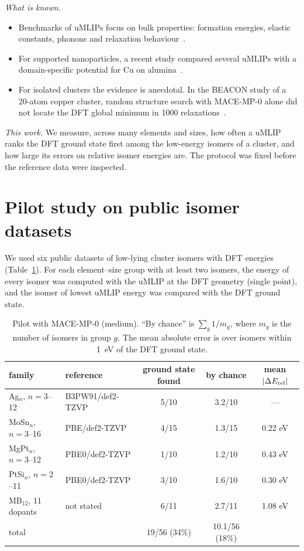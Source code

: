 \documentclass[11pt]{article}
\begin{document}
\textit{What is known.}
\begin{itemize}
\item Benchmarks of uMLIPs focus on bulk properties: formation energies, elastic constants, phonons and relaxation
behaviour~\cite{MatbenchDiscovery,PhononBench}.
\item For supported nanoparticles, a recent study compared several uMLIPs with a domain-specific potential for Cu on
alumina~\cite{SupportedNP}.
\item For isolated clusters the evidence is anecdotal. In the BEACON study of a 20-atom copper cluster, random
structure search with MACE-MP-0 alone did not locate the DFT global minimum in 1000 relaxations~\cite{BEACON}.
\end{itemize}

\textit{This work.} We measure, across many elements and sizes, how often a uMLIP ranks the DFT ground state first
among the low-energy isomers of a cluster, and how large its errors on relative isomer energies are. The protocol was
fixed before the reference data were inspected.

\section{Pilot study on public isomer datasets}
\label{sec:pilot}
We used six public datasets of low-lying cluster isomers with DFT energies
(Table~\ref{tab:pilot}). For each element--size group with at least two isomers, the energy of every isomer was
computed with the uMLIP at the DFT geometry (single point), and the isomer of lowest uMLIP energy was compared with
the DFT ground state.

\begin{table}[h]
\centering
\begin{tabular}{llccc}
\toprule
family & reference & ground state found & by chance & mean $|\Delta E_{\rm rel}|$ \\
\midrule
Ag$_n$, $n=3$--12 & B3PW91/def2-TZVP & 5/10 & 3.2/10 & --- \\
MoSn$_n$, $n=3$--16 & PBE/def2-TZVP & 4/15 & 1.3/15 & 0.22 eV \\
MgPt$_n$, $n=3$--12 & PBE0/def2-TZVP & 1/10 & 1.2/10 & 0.43 eV \\
PtSi$_n$, $n=2$--11 & PBE0/def2-TZVP & 3/10 & 1.6/10 & 0.30 eV \\
MB$_{12}$, 11 dopants & not stated & 6/11 & 2.7/11 & 1.08 eV \\
\midrule
total & & 19/56 (34\%) & 10.1/56 (18\%) & \\
\bottomrule
\end{tabular}
\caption{Pilot with MACE-MP-0 (medium). ``By chance'' is $\sum_g 1/m_g$, where $m_g$ is the number of isomers in
group $g$. The mean absolute error is over isomers within 1~eV of the DFT ground state.}
\label{tab:pilot}
\end{table}
\end{document}
